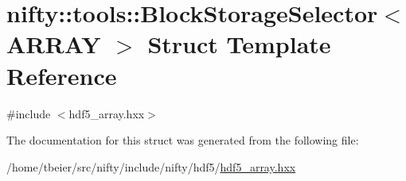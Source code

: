 \hypertarget{structnifty_1_1tools_1_1BlockStorageSelector}{}\section{nifty\+:\+:tools\+:\+:Block\+Storage\+Selector$<$ A\+R\+R\+A\+Y $>$ Struct Template Reference}
\label{structnifty_1_1tools_1_1BlockStorageSelector}


{\ttfamily \#include $<$hdf5\+\_\+array.\+hxx$>$}



The documentation for this struct was generated from the following file\+:\begin{DoxyCompactItemize}
\item 
/home/tbeier/src/nifty/include/nifty/hdf5/\hyperlink{hdf5__array_8hxx}{hdf5\+\_\+array.\+hxx}\end{DoxyCompactItemize}
